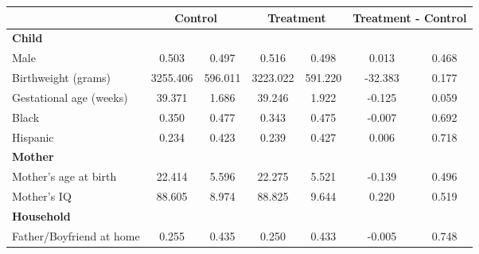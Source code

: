 \begin{tabular}{lcccccc}
\toprule
& \multicolumn{2}{c}{Control} & \multicolumn{2}{c}{Treatment} & \multicolumn{2}{c}{Treatment - Control} \\
\midrule
\textbf{Child} & & & & & & \\
\quad\quad Male & 0.503 & 0.497 & 0.516 & 0.498 & 0.013 & 0.468 \\
\quad\quad Birthweight (grams) & 3255.406 & 596.011 & 3223.022 & 591.220 & -32.383 & 0.177 \\
\quad\quad Gestational age (weeks) & 39.371 & 1.686 & 39.246 & 1.922 & -0.125 & 0.059 \\
\quad\quad Black & 0.350 & 0.477 & 0.343 & 0.475 & -0.007 & 0.692 \\
\quad\quad Hispanic & 0.234 & 0.423 & 0.239 & 0.427 & 0.006 & 0.718 \\
\textbf{Mother} & & & & & & \\
\quad\quad Mother's age at birth & 22.414 & 5.596 & 22.275 & 5.521 & -0.139 & 0.496 \\
\quad\quad Mother's IQ & 88.605 & 8.974 & 88.825 & 9.644 & 0.220 & 0.519 \\
\textbf{Household} & & & & & & \\
\quad\quad Father/Boyfriend at home & 0.255 & 0.435 & 0.250 & 0.433 & -0.005 & 0.748 \\
\bottomrule
\end{tabular}
